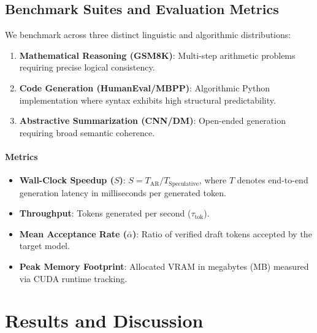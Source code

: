 \documentclass[10pt,twocolumn,letterpaper]{article}
\begin{document}
\subsection{Benchmark Suites and Evaluation Metrics}
We benchmark across three distinct linguistic and algorithmic distributions:
\begin{enumerate}
    \item \textbf{Mathematical Reasoning (GSM8K)}: Multi-step arithmetic problems requiring precise logical consistency.
    \item \textbf{Code Generation (HumanEval/MBPP)}: Algorithmic Python implementation where syntax exhibits high structural predictability.
    \item \textbf{Abstractive Summarization (CNN/DM)}: Open-ended generation requiring broad semantic coherence.
\end{enumerate}

\paragraph{Metrics}
\begin{itemize}
    \item \textbf{Wall-Clock Speedup ($S$)}: $S = T_{\text{AR}} / T_{\text{Speculative}}$, where $T$ denotes end-to-end generation latency in milliseconds per generated token.
    \item \textbf{Throughput}: Tokens generated per second ($\tau_{\text{tok}}$).
    \item \textbf{Mean Acceptance Rate ($\bar{\alpha}$)}: Ratio of verified draft tokens accepted by the target model.
    \item \textbf{Peak Memory Footprint}: Allocated VRAM in megabytes (MB) measured via CUDA runtime tracking.
\end{itemize}

\section{Results and Discussion}
\end{document}

